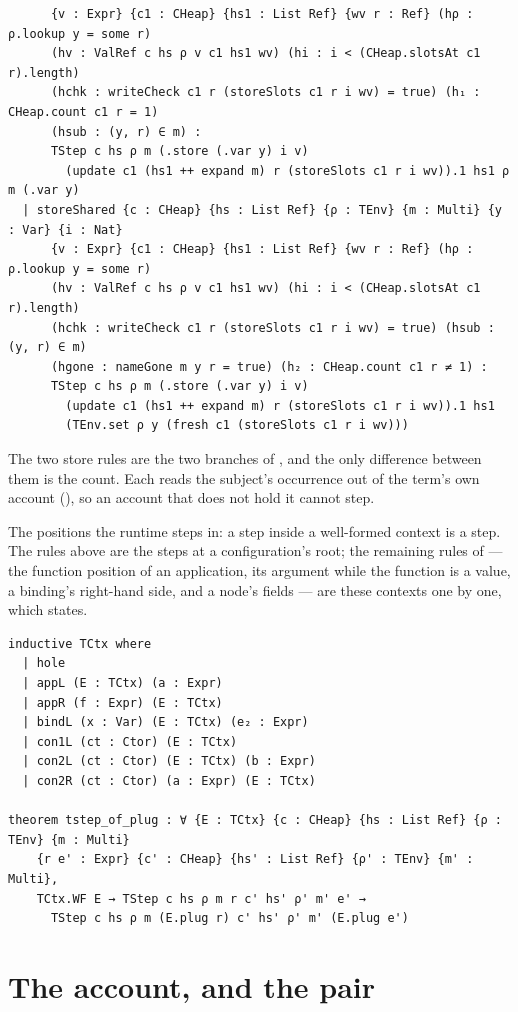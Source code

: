 \documentclass[11pt]{article}
\newcommand{\code}[1]{\texttt{\detokenize{#1}}}
\newcommand{\lref}[1]{\code{#1}}
\theoremstyle{remark}
\begin{document}
\begin{lstlisting}
      {v : Expr} {c1 : CHeap} {hs1 : List Ref} {wv r : Ref} (hρ : ρ.lookup y = some r)
      (hv : ValRef c hs ρ v c1 hs1 wv) (hi : i < (CHeap.slotsAt c1 r).length)
      (hchk : writeCheck c1 r (storeSlots c1 r i wv) = true) (h₁ : CHeap.count c1 r = 1)
      (hsub : (y, r) ∈ m) :
      TStep c hs ρ m (.store (.var y) i v)
        (update c1 (hs1 ++ expand m) r (storeSlots c1 r i wv)).1 hs1 ρ m (.var y)
  | storeShared {c : CHeap} {hs : List Ref} {ρ : TEnv} {m : Multi} {y : Var} {i : Nat}
      {v : Expr} {c1 : CHeap} {hs1 : List Ref} {wv r : Ref} (hρ : ρ.lookup y = some r)
      (hv : ValRef c hs ρ v c1 hs1 wv) (hi : i < (CHeap.slotsAt c1 r).length)
      (hchk : writeCheck c1 r (storeSlots c1 r i wv) = true) (hsub : (y, r) ∈ m)
      (hgone : nameGone m y r = true) (h₂ : CHeap.count c1 r ≠ 1) :
      TStep c hs ρ m (.store (.var y) i v)
        (update c1 (hs1 ++ expand m) r (storeSlots c1 r i wv)).1 hs1
        (TEnv.set ρ y (fresh c1 (storeSlots c1 r i wv)))
\end{lstlisting}

\noindent The two store rules are the two branches of \lref{update}, and the only
difference between them is the count. Each reads the subject's occurrence out of the
term's own account (\lref{hsub}), so an account that does not hold it cannot step.

\noindent The positions the runtime steps in: a step inside a well-formed context is
a step. The rules above are the steps at a configuration's root; the remaining rules
of \lref{TStep} --- the function position of an application, its argument while the
function is a value, a binding's right-hand side, and a node's fields --- are these
contexts one by one, which \lref{tstep_of_plug} states.

\begin{lstlisting}
inductive TCtx where
  | hole
  | appL (E : TCtx) (a : Expr)
  | appR (f : Expr) (E : TCtx)
  | bindL (x : Var) (E : TCtx) (e₂ : Expr)
  | con1L (ct : Ctor) (E : TCtx)
  | con2L (ct : Ctor) (E : TCtx) (b : Expr)
  | con2R (ct : Ctor) (a : Expr) (E : TCtx)

theorem tstep_of_plug : ∀ {E : TCtx} {c : CHeap} {hs : List Ref} {ρ : TEnv} {m : Multi}
    {r e' : Expr} {c' : CHeap} {hs' : List Ref} {ρ' : TEnv} {m' : Multi},
    TCtx.WF E → TStep c hs ρ m r c' hs' ρ' m' e' →
      TStep c hs ρ m (E.plug r) c' hs' ρ' m' (E.plug e')
\end{lstlisting}

\section{The account, and the pair}
\label{sec:account}
\end{document}
